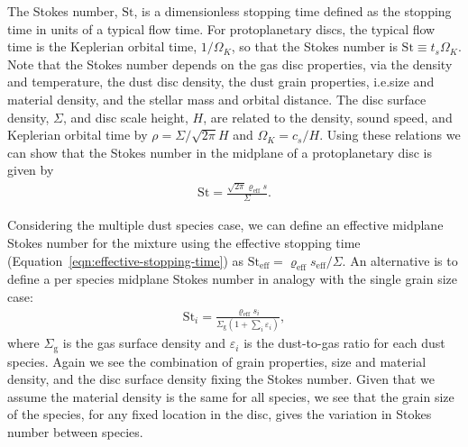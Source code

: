 \documentclass[fleqn,usenatbib]{mnras}
\newcommand{\g}{\mathrm{g}}
\begin{document}
The Stokes number, \(\mathrm{St}\), is a dimensionless stopping time defined as
the stopping time in units of a typical flow time. For protoplanetary discs, the
typical flow time is the Keplerian orbital time, \(1/\Omega_K\), so that the
Stokes number is \(\mathrm{St} \equiv t_s \Omega_K\). Note that the Stokes
number depends on the gas disc properties, via the density and temperature, the
dust disc density, the dust grain properties, i.e.\@ size and material density,
and the stellar mass and orbital distance. The disc surface density, \(\Sigma\),
and disc scale height, \(H\), are related to the density, sound speed, and
Keplerian orbital time by \(\rho = \Sigma / \sqrt{2\pi} H\) and \(\Omega_K = c_s
/ H\). Using these relations we can show that the Stokes number in the midplane
of a protoplanetary disc is given by
%
\begin{align}
   \mathrm{St} = \frac{\sqrt{2\pi} \varrho_{\mathrm{eff}} s}{\Sigma}.
\end{align}

Considering the multiple dust species case, we can define an effective midplane
Stokes number for the mixture using the effective stopping time
(Equation~\ref{eqn:effective-stopping-time}) as \(\mathrm{St}_{\mathrm{eff}} =
\varrho_{\mathrm{eff}} s_{\mathrm{eff}} / \Sigma \). An alternative is to define
a per species midplane Stokes number in analogy with the single grain size case:
%
\begin{align}
   \label{eqn:stokes}
   \mathrm{St}_i = \frac{\varrho_{\mathrm{eff}} s_i}
      {\Sigma_{\g} \left(1 + \sum_i \varepsilon_i \right)},
\end{align}
%
where \(\Sigma_{\g}\) is the gas surface density and \(\varepsilon_i\) is the
dust-to-gas ratio for each dust species. Again we see the combination of grain
properties, size and material density, and the disc surface density fixing the
Stokes number. Given that we assume the material density is the same for all
species, we see that the grain size of the species, for any fixed location in
the disc, gives the variation in Stokes number between species.
\end{document}
